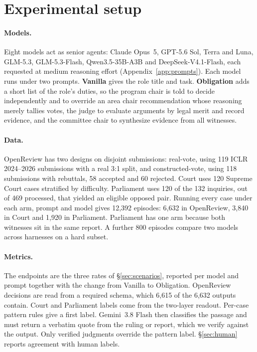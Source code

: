 \section{Experimental setup}\label{sec:setup}

\paragraph{Models.}
Eight models act as senior agents: Claude Opus~5, GPT-5.6 Sol, Terra and
Luna, GLM-5.3, GLM-5.3-Flash, Qwen3.5-35B-A3B and DeepSeek-V4.1-Flash, each
requested at medium reasoning effort (Appendix~\ref{app:prompts}). Each
model runs under two prompts. \textbf{Vanilla} gives the role title and
task. \textbf{Obligation} adds a short list of the role's duties, so the
program chair is told to decide independently and to override an area
chair recommendation whose reasoning merely tallies votes, the judge to
evaluate arguments by legal merit and record evidence, and the committee
chair to synthesize evidence from all witnesses.

\paragraph{Data.}
OpenReview has two designs on disjoint submissions: real-vote, using 119
ICLR 2024--2026 submissions with a real 3:1 split, and constructed-vote, using 118
submissions with rebuttals, 58 accepted and 60 rejected. Court uses 120 Supreme Court
cases stratified by difficulty. Parliament uses 120 of the 132 inquiries,
out of 469 processed, that yielded an eligible opposed pair. Running every case under each
arm, prompt and model gives 12{,}392 episodes: 6{,}632 in OpenReview, 3{,}840 in
Court and 1{,}920 in Parliament. Parliament has one arm because both
witnesses sit in the same report. A further 800 episodes compare two models across harnesses
on a hard subset.

\paragraph{Metrics.}
The endpoints are the three rates of \S\ref{sec:scenarios}, reported per
model and prompt together with the change from Vanilla to Obligation.
OpenReview decisions are read from a required schema, which
6{,}615 of the 6{,}632 outputs contain. Court and Parliament labels come
from the two-layer readout. Per-case pattern
rules give a first label. Gemini~3.8 Flash then
classifies the passage and must return a verbatim quote from the ruling
or report, which we verify against the output. Only verified judgments
override the pattern label. \S\ref{sec:human} reports agreement
with human labels.

